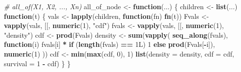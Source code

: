 \documentclass[
]{article}
\newenvironment{Shaded}{\begin{snugshade}}{\end{snugshade}}
\newcommand{\AttributeTok}[1]{\textcolor[rgb]{0.13,0.29,0.53}{#1}}
\newcommand{\CommentTok}[1]{\textcolor[rgb]{0.56,0.35,0.01}{\textit{#1}}}
\newcommand{\ControlFlowTok}[1]{\textcolor[rgb]{0.13,0.29,0.53}{\textbf{#1}}}
\newcommand{\DataTypeTok}[1]{\textcolor[rgb]{0.13,0.29,0.53}{#1}}
\newcommand{\DecValTok}[1]{\textcolor[rgb]{0.00,0.00,0.81}{#1}}
\newcommand{\FunctionTok}[1]{\textcolor[rgb]{0.13,0.29,0.53}{\textbf{#1}}}
\newcommand{\NormalTok}[1]{#1}
\newcommand{\OtherTok}[1]{\textcolor[rgb]{0.56,0.35,0.01}{#1}}
\newcommand{\SpecialCharTok}[1]{\textcolor[rgb]{0.81,0.36,0.00}{\textbf{#1}}}
\newcommand{\StringTok}[1]{\textcolor[rgb]{0.31,0.60,0.02}{#1}}
\begin{document}
\begin{Shaded}
\begin{Highlighting}[]
\CommentTok{\# all\_of(X1, X2, ..., Xn)}
\NormalTok{all\_of\_node }\OtherTok{\textless{}{-}} \ControlFlowTok{function}\NormalTok{(...) \{}
\NormalTok{  children }\OtherTok{\textless{}{-}} \FunctionTok{list}\NormalTok{(...)}
  \ControlFlowTok{function}\NormalTok{(t) \{}
\NormalTok{    vals }\OtherTok{\textless{}{-}} \FunctionTok{lapply}\NormalTok{(children, }\ControlFlowTok{function}\NormalTok{(fn) }\FunctionTok{fn}\NormalTok{(t))}
\NormalTok{    Fvals }\OtherTok{\textless{}{-}} \FunctionTok{vapply}\NormalTok{(vals, }\StringTok{\textasciigrave{}}\AttributeTok{[[}\StringTok{\textasciigrave{}}\NormalTok{, }\FunctionTok{numeric}\NormalTok{(}\DecValTok{1}\NormalTok{), }\StringTok{"cdf"}\NormalTok{)}
\NormalTok{    fvals }\OtherTok{\textless{}{-}} \FunctionTok{vapply}\NormalTok{(vals, }\StringTok{\textasciigrave{}}\AttributeTok{[[}\StringTok{\textasciigrave{}}\NormalTok{, }\FunctionTok{numeric}\NormalTok{(}\DecValTok{1}\NormalTok{), }\StringTok{"density"}\NormalTok{)}
\NormalTok{    cdf }\OtherTok{\textless{}{-}} \FunctionTok{prod}\NormalTok{(Fvals)}
\NormalTok{    density }\OtherTok{\textless{}{-}} \FunctionTok{sum}\NormalTok{(}\FunctionTok{vapply}\NormalTok{(}
      \FunctionTok{seq\_along}\NormalTok{(fvals),}
      \ControlFlowTok{function}\NormalTok{(i) fvals[i] }\SpecialCharTok{*} \ControlFlowTok{if}\NormalTok{ (}\FunctionTok{length}\NormalTok{(fvals) }\SpecialCharTok{==} \DecValTok{1}\DataTypeTok{L}\NormalTok{) }\DecValTok{1} \ControlFlowTok{else} \FunctionTok{prod}\NormalTok{(Fvals[}\SpecialCharTok{{-}}\NormalTok{i]),}
      \FunctionTok{numeric}\NormalTok{(}\DecValTok{1}\NormalTok{)}
\NormalTok{    ))}
\NormalTok{    cdf }\OtherTok{\textless{}{-}} \FunctionTok{min}\NormalTok{(}\FunctionTok{max}\NormalTok{(cdf, }\DecValTok{0}\NormalTok{), }\DecValTok{1}\NormalTok{)}
    \FunctionTok{list}\NormalTok{(}\AttributeTok{density =}\NormalTok{ density, }\AttributeTok{cdf =}\NormalTok{ cdf, }\AttributeTok{survival =} \DecValTok{1} \SpecialCharTok{{-}}\NormalTok{ cdf)}
\NormalTok{  \}}
\NormalTok{\}}


\end{Highlighting}
\end{Shaded}
\end{document}
